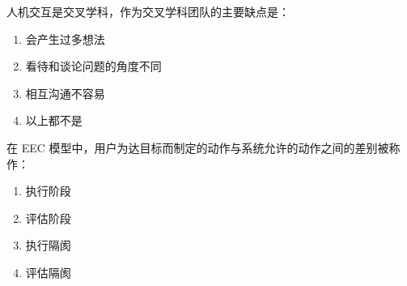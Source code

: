 \begin{problem}
	人机交互是交叉学科，作为交叉学科团队的主要缺点是： 
    \vspace{-0.8em}
    \begin{multicols}{2}
        \begin{enumerate}[label=\Alph*.]
            \item 会产生过多想法
            \item 看待和谈论问题的角度不同
            \item 相互沟通不容易
            \item 以上都不是
        \end{enumerate}
    \end{multicols}
    \vspace{-1em}
\end{problem}



\begin{problem}
	在 EEC 模型中，用户为达目标而制定的动作与系统允许的动作之间的差别被称作：  
    \vspace{-0.8em}
    \begin{multicols}{4}
        \begin{enumerate}[label=\Alph*.]
            \item 执行阶段
            \item 评估阶段
            \item 执行隔阂
            \item 评估隔阂
        \end{enumerate}
    \end{multicols}
    \vspace{-1em}
\end{problem}
